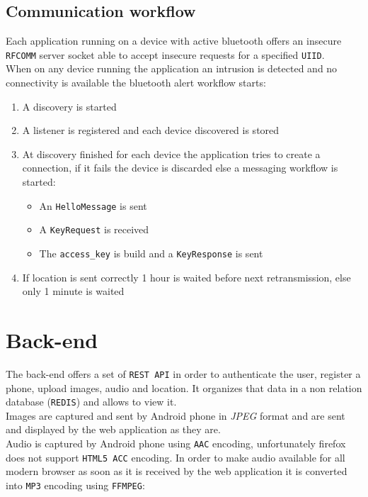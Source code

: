 \documentclass[conference]{IEEEtran}
\begin{document}
\subsection{\textbf{Communication workflow}}

Each application running on a device with active bluetooth offers an insecure \texttt{RFCOMM} server socket able to accept insecure requests for a specified \texttt{UIID}.\\

When on any device running the application an intrusion is detected and no connectivity is available the bluetooth alert workflow starts:\\
\begin{enumerate}
	\item A discovery is started
	\item A listener is registered and each device discovered is stored
	\item At discovery finished for each device the application tries to create a connection, if it fails the device is discarded else a messaging workflow is started:
		\begin{itemize}
			\item An \texttt{HelloMessage} is sent
			\item A \texttt{KeyRequest} is received
			\item The \texttt{access\_key} is build and a \texttt{KeyResponse} is sent
		\end{itemize}
	\item If location is sent correctly 1 hour is waited before next retransmission, else only 1 minute is waited
\end{enumerate}

\section{\textbf{Back-end}}
The back-end offers a set of \texttt{REST API} in order to authenticate the user, register a phone, upload images, audio and location. It organizes that data in a non relation database (\texttt{REDIS}) and allows to view it.\\

Images are captured and sent by Android phone in \textit{JPEG} format and are sent and displayed by the web application as they are.\\

Audio is captured by Android phone using \texttt{AAC} encoding, unfortunately firefox does not support \texttt{HTML5 ACC} encoding. In order to make audio available for all modern browser as soon as it is received by the web application it is converted into \texttt{MP3} encoding using \texttt{FFMPEG}:
\end{document}
